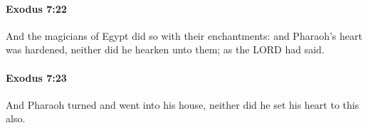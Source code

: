 		\paragraph{Exodus 7:22} %
			\label{EXODUS-7-22}

			And the magicians of Egypt did so with their enchantments: and Pharaoh's heart was hardened, neither did he hearken unto them; as the LORD had said.


		\paragraph{Exodus 7:23} %
			\label{EXODUS-7-23}

			And Pharaoh turned and went into his house, neither did he set his heart to this also.


